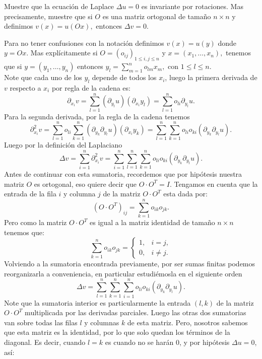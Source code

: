\documentclass{article}
\begin{document}
\begin{homeworkProblem}[3]
    Muestre que la ecuación de Laplace $\Delta u=0$ es invariante por rotaciones. Mas precisamente, muestre que si $O$ es una matriz ortogonal de tamaño $n\times n$ y definimos $v(x)=u(Ox),$ entonces $\Delta v=0.$
    \begin{solucion}
        Para no tener confusiones con la notación definimos $v(x)=u(y)$ donde $y=Ox$. Mas explícitamente si $O=(o_{ij})_{1\leq i,j\leq n}$ y $x=(x_1,\dots,x_n),$ tenemos que si $y=(y_1,\dots,y_n)$ entonces $y_l=\sum_{m=1}^no_{lm}x_m,$ con $1\leq l\leq n.$ \\
        Note que cada uno de los $y_l$ depende de todos los $x_i$, luego la primera derivada de $v$ respecto a $x_i$ por regla de la cadena es:
        $$\partial_{x_i}v=\sum_{l=1}^n(\partial_{y_l}u)(\partial_{x_i}y_l)=\sum_{l=1}^no_{li}\partial_{y_l}u.$$
        Para la segunda derivada, por la regla de la cadena tenemos 
        $$\partial^2_{x_i}v=\sum_{l=1}^no_{li}\sum_{k=1}^n(\partial_{y_k}\partial_{y_l}u)(\partial_{x_i}y_k)=\sum_{l=1}^n\sum_{k=1}^no_{li}o_{ki}(\partial_{y_k}\partial_{y_l}u).$$
        Luego por la definición del Laplaciano
        $$\Delta v=\sum_{i=1}^n\partial^2_{x_i}v=\sum_{i=1}^n\sum_{l=1}^n\sum_{k=1}^no_{li}o_{ki}(\partial_{y_k}\partial_{y_l}u).$$
        Antes de continuar con esta sumatoria, recordemos que por hipótesis nuestra matriz $O$ es ortogonal, eso quiere decir que $O\cdot O^T=I.$ Tengamos en cuenta que la entrada de la fila $i$ y columna $j$ de la matriz $O\cdot O^T$ esta dada por:
        $$(O\cdot O^T)_{ij}=\sum_{k=1}^no_{ik}o_{jk}.$$
        Pero como la matriz $O\cdot O^T$ es igual a la matriz identidad de tamaño $n\times n$ tenemos que:
        $$\sum_{k=1}^no_{ik}o_{jk}=\begin{cases}
         1, & i=j,\\
         0, & i\neq j.
        \end{cases}$$
        Volviendo a la sumatoria encontrada previamente, por ser sumas finitas podemos reorganizarla a conveniencia, en particular estudiémosla en el siguiente orden
        $$\Delta v=\sum_{l=1}^n\sum_{k=1}^n\sum_{i=1}^no_{li}o_{ki}(\partial_{y_k}\partial_{y_l}u).$$
        Note que la sumatoria interior es particularmente la entrada $(l,k)$ de la matriz $O\cdot O^T$ multiplicada por las derivadas parciales. Luego las otras dos sumatorias van sobre todas las filas $l$ y columnas $k$ de esta matriz. Pero, nosotros sabemos que esta matriz es la identidad, por lo que solo quedan los términos de la diagonal. Es decir, cuando $l=k$ es cuando no se harán $0$, y por hipótesis $\Delta u=0$, así:

\end{solucion}
\end{homeworkProblem}
\end{document}
